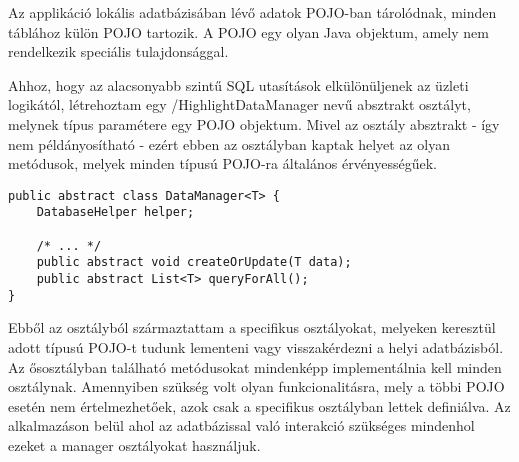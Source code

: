 Az applikáció lokális adatbázisában lévő adatok POJO-ban tárolódnak, minden táblához külön POJO tartozik.
A POJO egy olyan Java objektum, amely nem rendelkezik speciális tulajdonsággal.

Ahhoz, hogy az alacsonyabb szintű SQL utasítások elkülönüljenek az üzleti logikától, létrehoztam egy /Highlight{DataManager} nevű absztrakt osztályt, melynek típus paramétere egy POJO objektum. 
Mivel az osztály absztrakt - így nem példányosítható - ezért ebben az osztályban kaptak helyet az olyan metódusok, melyek minden típusú POJO-ra általános érvényességűek. 
\begin{lstlisting}
public abstract class DataManager<T> {	
    DatabaseHelper helper;
	
	/* ... */
    public abstract void createOrUpdate(T data);
    public abstract List<T> queryForAll();
}
\end{lstlisting}
Ebből az osztályból származtattam a specifikus osztályokat, melyeken keresztül adott típusú POJO-t tudunk lementeni vagy visszakérdezni a helyi adatbázisból. Az ősosztályban található metódusokat mindenképp implementálnia kell minden osztálynak. Amennyiben szükség volt olyan funkcionalitásra, mely a többi POJO esetén nem értelmezhetőek, azok csak a specifikus osztályban lettek definiálva.
Az alkalmazáson belül ahol az adatbázissal való interakció szükséges mindenhol ezeket a manager osztályokat használjuk. 
